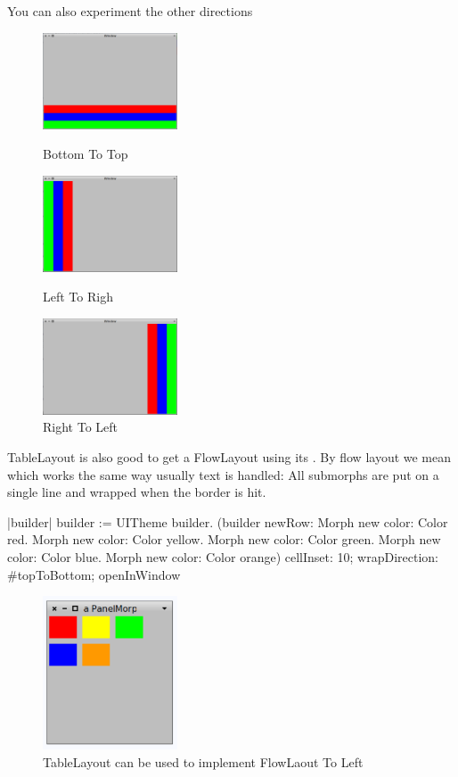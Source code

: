 \documentclass[a4paper,10pt,twoside]{book}
\begin{document}
You can also experiment the other directions

\begin{figure}[ht]\centering
	\includegraphics[width=4cm]{TableLayout3}
	\caption{Bottom To Top}
	\label{fig:tableLayout3}
	\includegraphics[width=4cm]{TableLayout4}
	\caption{Left To Righ}
	\label{fig:tableLayout4}
	\includegraphics[width=4cm]{TableLayout5}
	\caption{Right To Left}
	\label{fig:tableLayout5}
\end{figure}


TableLayout is also good to get a FlowLayout using its .
By flow layout we mean  which works the same way usually text is handled:
All submorphs are put on a single line and wrapped when the border is hit.

\begin{code}{}
|builder|
builder := UITheme builder.
(builder newRow: {
   Morph new color: Color red.
   Morph new color: Color yellow.
   Morph new color: Color green.
   Morph new color: Color blue.
   Morph new color: Color orange})
      cellInset: 10;
      wrapDirection: #topToBottom;
      openInWindow
\end{code}

\begin{figure}[ht]\centering
	\includegraphics[width=4cm]{FlowLayout}
	\caption{TableLayout can be used to implement FlowLaout To Left}
	\label{fig:tableLayout5}
\end{figure}
\end{document}
